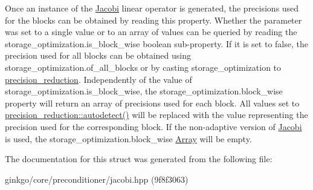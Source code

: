 Once an instance of the \hyperlink{classgko_1_1preconditioner_1_1Jacobi}{Jacobi} linear operator is generated, the precisions used for the blocks can be obtained by reading this property. Whether the parameter was set to a single value or to an array of values can be queried by reading the {\ttfamily storage\+\_\+optimization.\+is\+\_\+block\+\_\+wise} boolean sub-\/property. If it is set to {\ttfamily false}, the precision used for all blocks can be obtained using {\ttfamily storage\+\_\+optimization.\+of\+\_\+all\+\_\+blocks} or by casting {\ttfamily storage\+\_\+optimization} to {\ttfamily \hyperlink{classgko_1_1precision__reduction}{precision\+\_\+reduction}}. Independently of the value of {\ttfamily storage\+\_\+optimization.\+is\+\_\+block\+\_\+wise}, the {\ttfamily storage\+\_\+optimization.\+block\+\_\+wise} property will return an array of precisions used for each block. All values set to {\ttfamily \hyperlink{classgko_1_1precision__reduction_ac4109c61fadb24db7a1888c51ac483e9}{precision\+\_\+reduction\+::autodetect()}} will be replaced with the value representing the precision used for the corresponding block. If the non-\/adaptive version of \hyperlink{classgko_1_1preconditioner_1_1Jacobi}{Jacobi} is used, the {\ttfamily storage\+\_\+optimization.\+block\+\_\+wise} \hyperlink{classgko_1_1Array}{Array} will be empty. 

The documentation for this struct was generated from the following file\+:\begin{DoxyCompactItemize}
\item 
ginkgo/core/preconditioner/jacobi.\+hpp (9f8f3063)\end{DoxyCompactItemize}
